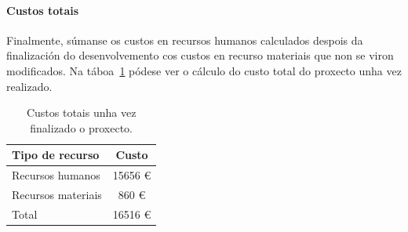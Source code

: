 \paragraph{Custos totais}
Finalmente, súmanse os custos en recursos humanos calculados despois da finalización do desenvolvemento cos custos en recurso materiais que non se viron modificados. Na táboa~\ref{tab:custoTotal} pódese ver o cálculo do custo total do proxecto unha vez realizado.

\begin{table} [tbh]
	\footnotesize
	\centering
	\begin{tabular}{|l|c|}
		\hline 
		\textbf{Tipo de recurso} & \textbf{Custo} \\ 
		\hline 
		Recursos humanos & 15656 € \\ 
		\hline 
		Recursos materiais & 860 € \\ 
		\hline 
		Total & 16516 € \\ 
		\hline 
	\end{tabular}
	\caption{Custos totais unha vez finalizado o proxecto.}
	\label{tab:custoTotal}
\end{table}
